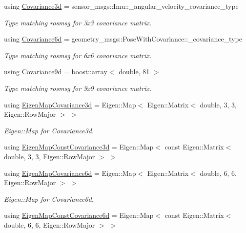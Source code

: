 \begin{DoxyCompactItemize}
\item 
using \mbox{\hyperlink{group__nodelib_ga56776cc8f5410a6bfeafa085fcd6fe30}{Covariance3d}} = sensor\+\_\+msgs\+::\+Imu\+::\+\_\+angular\+\_\+velocity\+\_\+covariance\+\_\+type
\begin{DoxyCompactList}\small\item\em Type matching rosmsg for 3x3 covariance matrix. \end{DoxyCompactList}\item 
using \mbox{\hyperlink{group__nodelib_gadc24a922dd3f6a7ff0d7aed9bda42bca}{Covariance6d}} = geometry\+\_\+msgs\+::\+Pose\+With\+Covariance\+::\+\_\+covariance\+\_\+type
\begin{DoxyCompactList}\small\item\em Type matching rosmsg for 6x6 covariance matrix. \end{DoxyCompactList}\item 
using \mbox{\hyperlink{group__nodelib_ga6df3c37d3cd74b3e6919e734575bb9b7}{Covariance9d}} = boost\+::array$<$ double, 81 $>$
\begin{DoxyCompactList}\small\item\em Type matching rosmsg for 9x9 covariance matrix. \end{DoxyCompactList}\item 
using \mbox{\hyperlink{group__nodelib_gabafbfa3aa489d1c304f320a417ce91d1}{Eigen\+Map\+Covariance3d}} = Eigen\+::\+Map$<$ Eigen\+::\+Matrix$<$ double, 3, 3, Eigen\+::\+Row\+Major $>$ $>$
\begin{DoxyCompactList}\small\item\em Eigen\+::\+Map for Covariance3d. \end{DoxyCompactList}\item 
using \mbox{\hyperlink{group__nodelib_ga05212907ea66649136fdbe0ecea29224}{Eigen\+Map\+Const\+Covariance3d}} = Eigen\+::\+Map$<$ const Eigen\+::\+Matrix$<$ double, 3, 3, Eigen\+::\+Row\+Major $>$ $>$
\item 
using \mbox{\hyperlink{group__nodelib_ga5d26d0ee661868a02a4fd476856757e3}{Eigen\+Map\+Covariance6d}} = Eigen\+::\+Map$<$ Eigen\+::\+Matrix$<$ double, 6, 6, Eigen\+::\+Row\+Major $>$ $>$
\begin{DoxyCompactList}\small\item\em Eigen\+::\+Map for Covariance6d. \end{DoxyCompactList}\item 
using \mbox{\hyperlink{group__nodelib_ga5e718b36aa6575dc90187729b5c96f4c}{Eigen\+Map\+Const\+Covariance6d}} = Eigen\+::\+Map$<$ const Eigen\+::\+Matrix$<$ double, 6, 6, Eigen\+::\+Row\+Major $>$ $>$

\end{DoxyCompactItemize}
